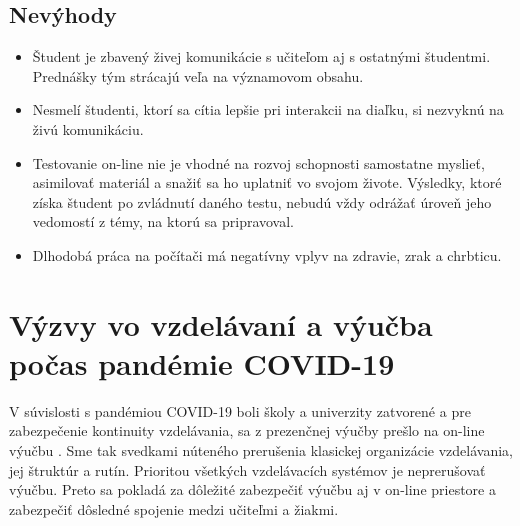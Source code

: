 \documentclass[10pt,oneside,slovak,a4paper]{article}
\begin{document}
\subsection{Nevýhody}
\begin{itemize}
	\item Študent je zbavený živej komunikácie s učiteľom aj s ostatnými študentmi. Prednášky tým strácajú veľa na významovom obsahu.
	\item Nesmelí študenti, ktorí sa cítia lepšie pri interakcii na diaľku, si nezvyknú na živú komunikáciu.
	\item Testovanie on-line nie je vhodné na rozvoj schopnosti samostatne myslieť, asimilovať materiál a snažiť sa ho uplatniť vo svojom živote. Výsledky, ktoré získa študent po zvládnutí daného testu, nebudú vždy odrážať úroveň jeho vedomostí z témy, na ktorú sa pripravoval.
	\item Dlhodobá práca na počítači má negatívny vplyv na zdravie, zrak a chrbticu.
\end{itemize}


\section{Výzvy vo vzdelávaní a výučba počas pandémie COVID-19}
V súvislosti s pandémiou COVID-19 boli školy a univerzity zatvorené a pre zabezpečenie kontinuity vzdelávania, sa z prezenčnej výučby prešlo na on-line výučbu \cite{covid19}.
Sme tak svedkami núteného prerušenia klasickej organizácie vzdelávania, jej štruktúr a rutín. Prioritou všetkých vzdelávacích systémov je neprerušovať výučbu.
Preto sa pokladá za dôležité zabezpečiť výučbu aj v on-line priestore a zabezpečiť dôsledné spojenie medzi učiteľmi a žiakmi. 
\end{document}
